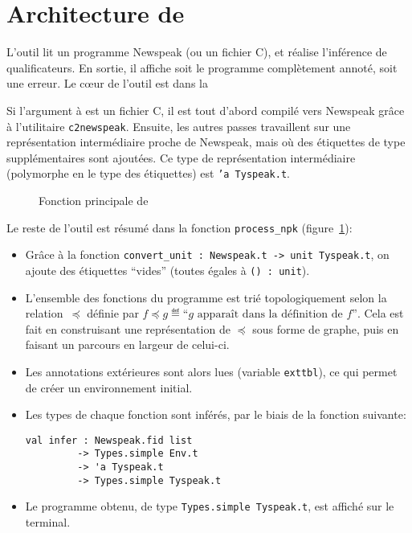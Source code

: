 \section{Architecture de \ptrtype}
\label{sec:ptrtype-archi}

L'outil \ptrtype{} lit un programme Newspeak (ou un fichier C), et réalise
l'inférence de qualificateurs. En sortie, il affiche soit le programme
complètement annoté, soit une erreur. Le cœur de l'outil est dans la

Si l'argument à \ptrtype{} est un fichier C, il est tout d'abord compilé vers
Newspeak grâce à l'utilitaire \texttt{c2newspeak}. Ensuite, les autres passes
travaillent sur une représentation intermédiaire proche de Newspeak, mais où des
étiquettes de type supplémentaires sont ajoutées. Ce type de représentation
intermédiaire (polymorphe en le type des étiquettes) est \texttt{'a Tyspeak.t}.

\begin{figure}
\caption{Fonction principale de \ptrtype{}}
\label{fig:implem-process}
\end{figure}

Le reste de l'outil est résumé dans la fonction
\texttt{process\_npk} (figure~\ref{fig:implem-process}):

\begin{itemize}

\item Grâce à la fonction \verb!convert_unit : Newspeak.t -> unit Tyspeak.t!,
  on ajoute des étiquettes ``vides'' (toutes égales à \verb!() : unit!).

\item L'ensemble des fonctions du programme est trié topologiquement selon la
  relation~$\preceq$ définie par $f \preceq g \eqdef \textrm{``} g
  \textrm{ apparaît dans la définition de } f \textrm{''}$. Cela est fait en
  construisant une représentation de $\preceq$ sous forme de graphe, puis en
  faisant un parcours en largeur de celui-ci.

\item Les annotations extérieures sont alors lues (variable \texttt{exttbl}), ce
  qui permet de créer un environnement initial.

\item Les types de chaque fonction sont inférés, par le biais de la fonction
  suivante:

\begin{Verbatim}
val infer : Newspeak.fid list
         -> Types.simple Env.t
         -> 'a Tyspeak.t
         -> Types.simple Tyspeak.t
\end{Verbatim}

\item Le programme obtenu, de type \texttt{Types.simple Tyspeak.t}, est affiché
  sur le terminal.

\end{itemize}

